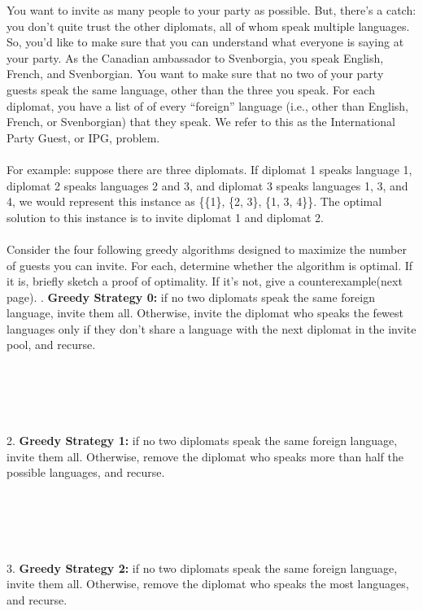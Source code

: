 \documentclass[12pt]{article}
\begin{document}
\noindent You want to invite as many people to your party as possible. 
But, there’s a catch: you don’t quite trust the
other diplomats, all of whom speak multiple languages. 
So, you’d like to make sure that you can understand
what everyone is saying at your party. As the Canadian 
ambassador to Svenborgia, you speak English,
French, and Svenborgian. You want to make sure 
that no two of your party guests speak the same language,
other than the three you speak. For each diplomat, 
you have a list of of every “foreign” language (i.e.,
other than English, French, or Svenborgian) that they 
speak. We refer to this as the International Party
Guest, or IPG, problem.\\\\
For example: suppose there 
are three diplomats. If 
diplomat 1 speaks language 
1, diplomat 2 speaks
languages 2 and 3, and diplomat 
3 speaks languages 1, 3, and 4, we 
would represent this instance as
\{\{1\}, \{2, 3\}, \{1, 3, 4\}\}. 
The optimal solution to this instance 
is to invite diplomat 1 and diplomat 2.\\\\
Consider the four following greedy algorithms 
designed to maximize the number of guests you 
can invite. For each, determine whether the 
algorithm is optimal. If it is, briefly sketch a 
proof of optimality. If
it’s not, give a counterexample(next page).
\newpage
{}. \textbf{Greedy Strategy 0:} if no two diplomats 
speak the same foreign language, invite them all. 
Otherwise, invite the diplomat who speaks the fewest 
languages only if they don't share a language with
the next diplomat in the invite pool, and recurse.\\\\\\\\\\\\
2. \textbf{Greedy Strategy 1:} if no two diplomats 
speak the same foreign language, invite them all. 
Otherwise, remove the diplomat who speaks 
more than half the possible languages, and recurse.\\\\\\\\\\\\
3. \textbf{Greedy Strategy 2:} if no two diplomats 
speak the same foreign language, invite them all. Otherwise,
remove the diplomat who speaks the most languages, and recurse.\\\\\\\\\\\\
\end{document}

